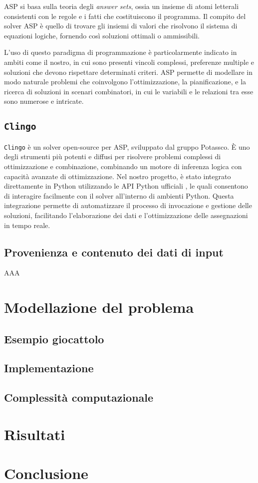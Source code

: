 \documentclass[draft,journal]{IEEEtran}
\begin{document}
ASP si basa sulla teoria degli \textit{answer sets}, ossia un insieme di atomi
letterali consistenti con le regole e i fatti che costituiscono il programma. Il
compito del solver ASP è quello di trovare gli insiemi di valori che risolvono
il sistema di equazioni logiche, fornendo così soluzioni ottimali o ammissibili.

L'uso di questo paradigma di programmazione è particolarmente indicato in ambiti
come il nostro, in cui sono presenti vincoli complessi, preferenze multiple e
soluzioni che devono rispettare determinati criteri. ASP permette di modellare
in modo naturale problemi che coinvolgono l'ottimizzazione, la pianificazione, e
la ricerca di soluzioni in scenari combinatori, in cui le variabili e le
relazioni tra esse sono numerose e intricate.

\subsection{\texttt{Clingo}}
\texttt{Clingo} è un solver open-source per ASP, sviluppato dal gruppo Potassco.
È uno degli strumenti più potenti e diffusi per risolvere problemi complessi di
ottimizzazione e combinazione, combinando un motore di inferenza logica con
capacità avanzate di ottimizzazione. Nel nostro progetto, è stato integrato
direttamente in Python utilizzando le API Python ufficiali
\cite{clingo_python_api}, le quali consentono di interagire facilmente con il
solver all'interno di ambienti Python. Questa integrazione permette di
automatizzare il processo di invocazione e gestione delle soluzioni, facilitando
l'elaborazione dei dati e l'ottimizzazione delle assegnazioni in tempo reale.

\subsection{Provenienza e contenuto dei dati di input}
AAA

\section{Modellazione del problema}
\subsection{Esempio giocattolo}
\subsection{Implementazione}
\subsection{Complessità computazionale}

\section{Risultati}

\section{Conclusione}



\end{document}
